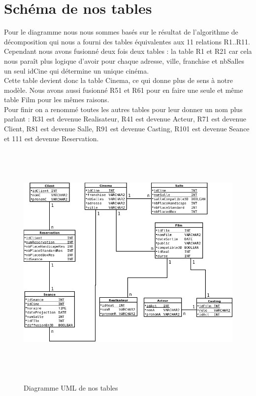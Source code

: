 \documentclass[a4paper,sffamily,12pt]{article}
\begin{document}
			\vspace{0.5cm}
		
		\section{Schéma de nos tables}

			\vspace{0.5cm}
					
		Pour le diagramme nous nous sommes basés sur le résultat de l'algorithme de décomposition qui nous a fourni des tables équivalentes aux 11 relations R1..R11. Cependant nous avons fusionné deux fois deux tables : la table R1 et R21 car cela nous paraît plus logique d'avoir pour chaque adresse, ville, franchise et nbSalles un seul idCine qui détermine un unique cinéma.\\
		\indent Cette table devient donc la table Cinema, ce qui donne plus de sens à notre modèle. Nous avons aussi fusionné R51 et R61 pour en faire une seule et même table Film pour les mêmes raisons.\\
		\indent Pour finir on a renommé toutes les autres tables pour leur donner un nom plus parlant : R31 est devenue Realisateur, R41 est devenue Acteur, R71 est devenue Client, R81 est devenue Salle, R91 est devenue Casting, R101 est devenue Seance et 111 est devenue Reservation.

				\begin{figure}[!h]		
					\hspace{-0.5cm}
					{\includegraphics[height=12cm]{picture/DiagrammeUML.png}}
					\caption{Diagramme UML de nos tables}
					\label{UML}
					\vspace{0.5cm}	
				\end{figure}		
\end{document}
